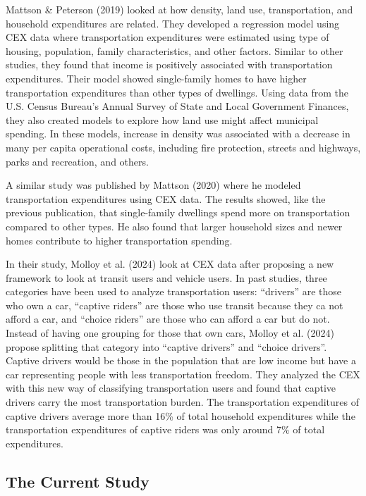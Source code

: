 \documentclass[
]{agujournal2019}
\begin{document}
Mattson \& Peterson (2019) looked at how density, land use,
transportation, and household expenditures are related. They developed a
regression model using CEX data where transportation expenditures were
estimated using type of housing, population, family characteristics, and
other factors. Similar to other studies, they found that income is
positively associated with transportation expenditures. Their model
showed single-family homes to have higher transportation expenditures
than other types of dwellings. Using data from the U.S. Census Bureau's
Annual Survey of State and Local Government Finances, they also created
models to explore how land use might affect municipal spending. In these
models, increase in density was associated with a decrease in many per
capita operational costs, including fire protection, streets and
highways, parks and recreation, and others.

A similar study was published by Mattson (2020) where he modeled
transportation expenditures using CEX data. The results showed, like the
previous publication, that single-family dwellings spend more on
transportation compared to other types. He also found that larger
household sizes and newer homes contribute to higher transportation
spending.

In their study, Molloy et al. (2024) look at CEX data after proposing a
new framework to look at transit users and vehicle users. In past
studies, three categories have been used to analyze transportation
users: ``drivers'' are those who own a car, ``captive riders'' are those
who use transit because they ca not afford a car, and ``choice riders''
are those who can afford a car but do not. Instead of having one
grouping for those that own cars, Molloy et al. (2024) propose splitting
that category into ``captive drivers'' and ``choice drivers''. Captive
drivers would be those in the population that are low income but have a
car representing people with less transportation freedom. They analyzed
the CEX with this new way of classifying transportation users and found
that captive drivers carry the most transportation burden. The
transportation expenditures of captive drivers average more than 16\% of
total household expenditures while the transportation expenditures of
captive riders was only around 7\% of total expenditures.

\subsection{The Current Study}\label{the-current-study}
\end{document}
